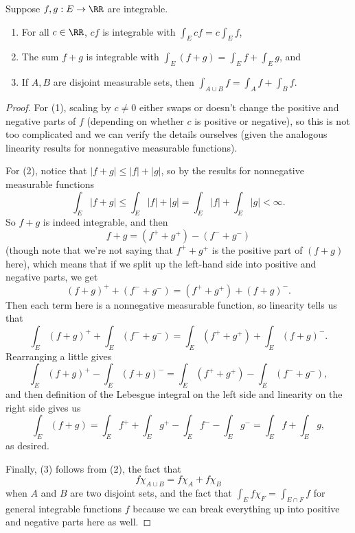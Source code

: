 \begin{proposition}
Suppose $f, g: E \to \RR$ are integrable. \begin{enumerate}
\item For all $c \in \RR$, $cf$ is integrable with $\int_E cf = c\int_E f$, \item The sum $f+g$ is integrable with $\int_E (f+g) = \int_E f + \int_E g$, and 
\item If $A, B$ are disjoint measurable sets, then $\int_{A \cup B} f = \int_A f + \int_B f$.
\end{enumerate}
\end{proposition}
\begin{proof}
For (1), scaling by $c \ne 0$ either swaps or doesn't change the positive and negative parts of $f$ (depending on whether $c$ is positive or negative), so this is not too complicated and we can verify the details ourselves (given the analogous linearity results for nonnegative measurable functions). 

For (2), notice that $|f+g| \le |f| + |g|$, so by the results for nonnegative measurable functions
\[
    \int_E |f+g| \le \int_E |f| + |g| = \int_E |f| + \int_E |g| < \infty.
\]
So $f+g$ is indeed integrable, and then 
\[
    f+g = (f^+ + g^+) - (f^- + g^-)
\]
(though note that we're not saying that $f^+ + g^+$ is the positive part of $(f+g)$ here), which means that if we split up the left-hand side into positive and negative parts, we get 
\[
    (f+g)^+ + (f^- + g^-) = (f^+ + g^+) + (f+g)^-.
\]
Then each term here is a nonnegative measurable function, so linearity tells us that 
\[
    \int_E (f+g)^+ + \int_E (f^- + g^-) = \int_E (f^+ + g^+) + \int_E (f+g)^-.
\]
Rearranging a little gives
\[
    \int_E (f+g)^+ - \int_E (f+g)^- = \int_E (f^+ + g^+) - \int_E (f^- + g^-),
\]
and then definition of the Lebesgue integral on the left side and linearity on the right side gives us 
\[
    \int_E (f+g) = \int_E f^+ + \int_E g^+ - \int_E f^- - \int_E g^- = \int_E f + \int_E g,
\]
as desired. 

Finally, (3) follows from (2), the fact that 
\[
    f \chi_{A \cup B} = f \chi_A + f \chi_B
\]
when $A$ and $B$ are two disjoint sets, and the fact that $\int_E f \chi_F = \int_{E \cap F} f$ for general integrable functions $f$ because we can break everything up into positive and negative parts here as well. 
\end{proof}

